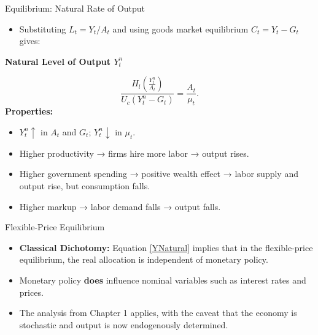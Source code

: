 \documentclass[11pt,aspectratio=169]{beamer}
\begin{document}
\begin{frame}[label=NaturalOutput]{Equilibrium: Natural Rate of Output}
\small

\begin{itemize}
  \item Substituting $L_t = Y_t / A_t$ and using goods market equilibrium $C_t = Y_t - G_t$ gives:
\end{itemize}
\textbf{Natural Level of Output $Y_t^n$}

\begin{equation}
\frac{H_l\left(\frac{Y_t^n}{A_t}\right)}{U_c(Y_t^n - G_t)} = \frac{A_t}{\mu_t}.
\label{YNatural}
\end{equation}
\textbf{ Properties:}
\begin{itemize}
  \item $Y_t^n \uparrow$ in $A_t$ and $G_t$; $Y_t^n \downarrow$ in $\mu_t$.
  \item Higher productivity → firms hire more labor → output rises.
  \item Higher government spending → positive wealth effect → labor supply and output rise, but consumption falls.
  \item Higher markup → labor demand falls → output falls. 
\end{itemize}

\end{frame}

\begin{frame}[label=ClassicalDichotomy]{Flexible-Price Equilibrium}
\small

\begin{itemize}
  \item \textbf{Classical Dichotomy:} Equation \eqref{YNatural} implies that in the flexible-price equilibrium, the real allocation is independent of monetary policy.
  \vspace{0.5em}
  \item Monetary policy \textbf{does} influence nominal variables such as interest rates and prices.
  \vspace{0.5em}
  \item The analysis from Chapter 1 applies, with the caveat that the economy is stochastic and output is now endogenously determined.
\end{itemize}

\end{frame}
\end{document}
